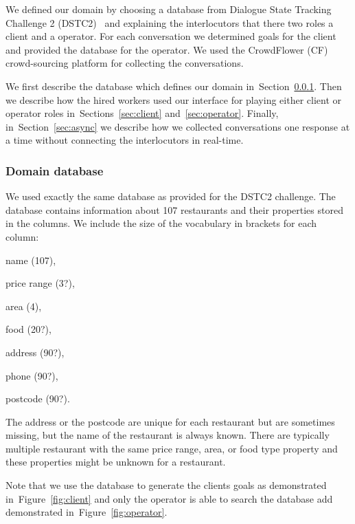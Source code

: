 \documentclass[runningheads,a4paper]{llncs}
\begin{document}
We defined our domain by choosing a database from Dialogue State Tracking Challenge 2 (DSTC2)~\cite{henderson2014dstc2} and explaining the interlocutors that there two roles a client and a operator.
For each conversation we determined goals for the client and provided the database for the operator.
We used the CrowdFlower (CF) crowd-sourcing platform for collecting the conversations.

We first describe the database which defines our domain in~Section~\ref{sec:db}.
Then we describe how the hired workers used our interface for playing either client or operator roles in~Sections~\ref{sec:client} and~\ref{sec:operator}.
Finally, in~Section~\ref{sec:async} we describe how we collected conversations one response at a time without connecting the interlocutors in real-time. 

\subsubsection{Domain database}
\label{sec:db}

We used exactly the same database as provided for the DSTC2 challenge.
The database contains information about 107 restaurants and their properties stored in the columns.
We include the size of the vocabulary in brackets for each column:
\begin{inparaenum}
    \item name (107),
    \item price range (3?),
    \item area (4),
    \item food (20?),
    \item address (90?),
    \item phone (90?),
    \item postcode (90?).
\end{inparaenum}

The address or the postcode are unique for each restaurant but are sometimes missing, but the name of the restaurant is always known. 
There are typically multiple restaurant with the same price range, area, or food type property and these properties might be unknown for a restaurant.

Note that we use the database to generate the clients goals as demonstrated in~Figure~\ref{fig:client} and only the operator is able to search the database add demonstrated in~Figure~\ref{fig:operator}.
\end{document}
